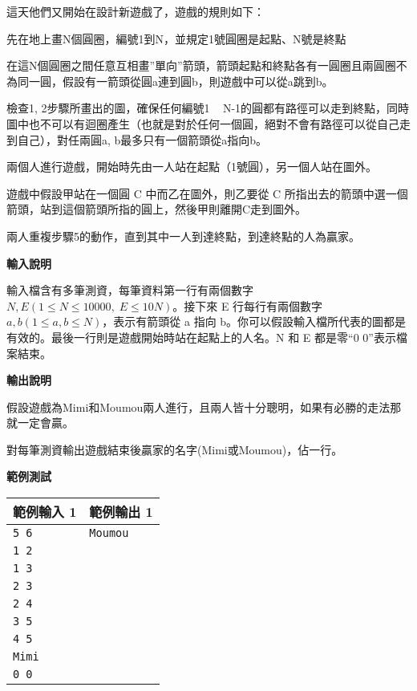     這天他們又開始在設計新遊戲了，遊戲的規則如下：

    先在地上畫N個圓圈，編號1到N，並規定1號圓圈是起點、N號是終點

    在這N個圓圈之間任意互相畫”單向”箭頭，箭頭起點和終點各有一圓圈且兩圓圈不為同一圓，假設有一箭頭從圓a連到圓b，則遊戲中可以從a跳到b。

    檢查1, 2步驟所畫出的圖，確保任何編號1 ~ N-1的圓都有路徑可以走到終點，同時圖中也不可以有迴圈產生（也就是對於任何一個圓，絕對不會有路徑可以從自己走到自己），對任兩圓a, b最多只有一個箭頭從a指向b。

    兩個人進行遊戲，開始時先由一人站在起點（1號圓），另一個人站在圖外。

    遊戲中假設甲站在一個圓 C 中而乙在圖外，則乙要從 C 所指出去的箭頭中選一個箭頭，站到這個箭頭所指的圓上，然後甲則離開C走到圖外。

    兩人重複步驟5的動作，直到其中一人到達終點，到達終點的人為贏家。

    \textbf{輸入說明}

    輸入檔含有多筆測資，每筆資料第一行有兩個數字 $N,E(1 \le N \le 10000, \; E \le 10N)$。接下來 E 行每行有兩個數字 $a, b(1 \le a, b \le N)$，表示有箭頭從 a 指向 b。你可以假設輸入檔所代表的圖都是有效的。最後一行則是遊戲開始時站在起點上的人名。N 和 E 都是零``0 0”表示檔案結束。

    \textbf{輸出說明}

    假設遊戲為Mimi和Moumou兩人進行，且兩人皆十分聰明，如果有必勝的走法那就一定會贏。

    對每筆測資輸出遊戲結束後贏家的名字(Mimi或Moumou)，佔一行。

    \textbf{範例測試}

    \begin{tabular}{|m{7cm}|m{7cm}|}
        \hline
        範例輸入 1 & 範例輸出 1 \\
        \hline
        \verb|5 6|  & \verb|Moumou| \\
        \verb|1 2|  &\\
        \verb|1 3|  &\\
        \verb|2 3|  &\\
        \verb|2 4|  &\\
        \verb|3 5|  &\\
        \verb|4 5|  &\\
        \verb|Mimi|  &\\
        \verb|0 0|  &\\
        \hline
    \end{tabular}

